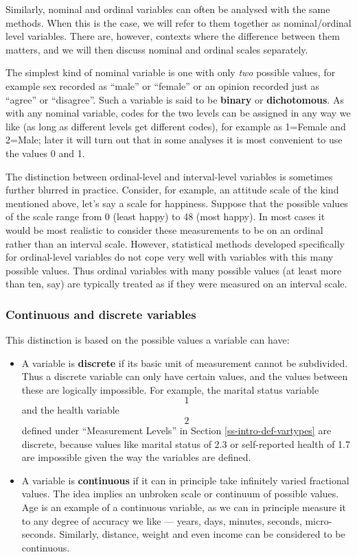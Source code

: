 \documentclass[11pt,a4paper,openany]{book}
\begin{document}
Similarly, nominal and ordinal variables can often be analysed with the
same methods. When this is the case, we will refer to them together as
nominal/ordinal level variables. There are, however, contexts where the
difference between them matters, and we will then discuss nominal and
ordinal scales separately.

The simplest kind of nominal variable is one with only \emph{two}
possible values, for example sex recorded as ``male'' or ``female'' or
an opinion recorded just as ``agree'' or ``disagree''. Such a variable
is said to be \textbf{binary} or \textbf{dichotomous}. As with any
nominal variable, codes for the two levels can be assigned in any way we
like (as long as different levels get different codes), for example as
1=Female and 2=Male; later it will turn out that in some analyses it is
most convenient to use the values 0 and 1.

The distinction between ordinal-level and interval-level variables is
sometimes further blurred in practice. Consider, for example, an
attitude scale of the kind mentioned above, let's say a scale for
happiness. Suppose that the possible values of the scale range from 0
(least happy) to 48 (most happy). In most cases it would be most
realistic to consider these measurements to be on an ordinal rather than
an interval scale. However, statistical methods developed specifically
for ordinal-level variables do not cope very well with variables with
this many possible values. Thus ordinal variables with many possible
values (at least more than ten, say) are typically treated as if they
were measured on an interval scale.

\subsubsection*{Continuous and discrete
variables}\label{continuous-and-discrete-variables}

This distinction is based on the possible values a variable can have:

\begin{itemize}
\item
  A variable is \textbf{discrete} if its basic unit of measurement
  cannot be subdivided. Thus a discrete variable can only have certain
  values, and the values between these are logically impossible. For
  example, the marital status variable \[1\] and the health variable
  \[2\] defined under ``Measurement Levels'' in Section
  \ref{ss-intro-def-vartypes} are discrete, because values like marital
  status of 2.3 or self-reported health of 1.7 are impossible given the
  way the variables are defined.
\item
  A variable is \textbf{continuous} if it can in principle take
  infinitely varied fractional values. The idea implies an unbroken
  scale or continuum of possible values. Age is an example of a
  continuous variable, as we can in principle measure it to any degree
  of accuracy we like --- years, days, minutes, seconds, micro-seconds.
  Similarly, distance, weight and even income can be considered to be
  continuous.
\end{itemize}
\end{document}
